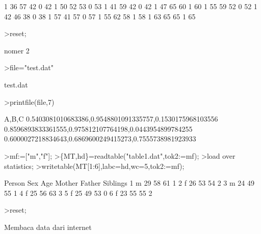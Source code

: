 \documentclass[a4paper,10pt]{article}
\begin{document}
\begin{eulernotebook}
\begin{eulercomment}
\begin{eulercomment}
\begin{eulercomment}
\begin{eulercomment}
\begin{eulercomment}
\begin{eulercomment}
\begin{eulercomment}
\begin{eulercomment}
\begin{euleroutput}
           1        36        57        42         0          42
           1        50        52        53         0          53
           1        41        59        42         0          42
           1        47        65        60         1          60
           1        55        59        52         0          52
           1        42        46        38         0          38
           1        57        41        57         0          57
           1        55        62        58         1          58
           1        63        65        65         1          65
\end{euleroutput}
\begin{eulerprompt}
>reset;
\end{eulerprompt}
\eulersubheading{}
\begin{eulercomment}
nomer 2
\end{eulercomment}
\begin{eulerprompt}
>file="test.dat"
\end{eulerprompt}
\begin{euleroutput}
  test.dat
\end{euleroutput}
\begin{eulerprompt}
>printfile(file,7)
\end{eulerprompt}
\begin{euleroutput}
  A,B,C
  0.5403081010683386,0.9548801091335757,0.1530175968103556
  0.8596893833361555,0.975812107764198,0.0443954899784255
  0.6000027218834643,0.6869600249415273,0.7555738981923933
  
\end{euleroutput}
\begin{eulerprompt}
>mf:=["m","f"];
>\{MT,hd\}=readtable("table1.dat",tok2:=mf);
>load over statistics;
>writetable(MT[1:6],labc=hd,wc=5,tok2:=mf);
\end{eulerprompt}
\begin{euleroutput}
   Person  Sex  Age Mother Father Siblings
        1    m   29     58     61        1
        2    f   26     53     54        2
        3    m   24     49     55        1
        4    f   25     56     63        3
        5    f   25     49     53        0
        6    f   23     55     55        2
\end{euleroutput}
\begin{eulerprompt}
>reset;
\end{eulerprompt}
\begin{eulercomment}
\begin{eulercomment}
\begin{eulercomment}
Membaca data dari internet


\end{eulercomment}
\end{eulercomment}
\end{eulercomment}
\end{eulercomment}
\end{eulercomment}
\end{eulercomment}
\end{eulercomment}
\end{eulercomment}
\end{eulercomment}
\end{eulercomment}
\end{eulercomment}
\end{eulernotebook}
\end{document}

